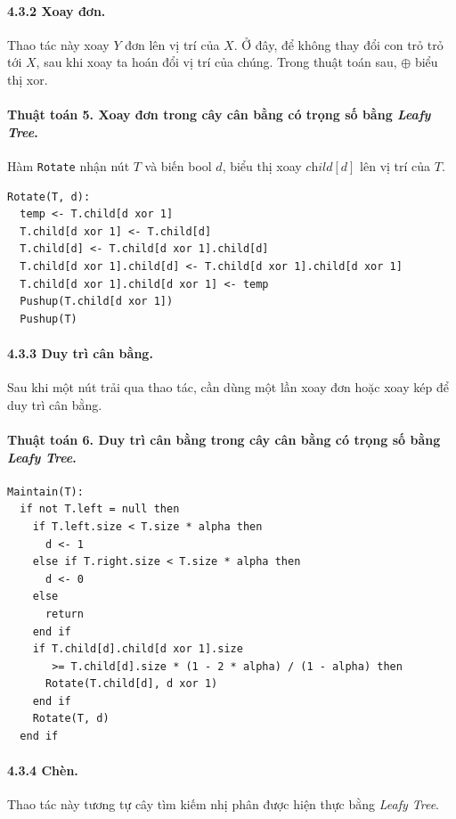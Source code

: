 \documentclass[11pt]{article}
\begin{document}
\paragraph{4.3.2 Xoay đơn.}
Thao tác này xoay \(Y\) đơn lên vị trí của \(X\). Ở đây, để không thay đổi con
trỏ trỏ tới \(X\), sau khi xoay ta hoán đổi vị trí của chúng. Trong thuật toán
sau, \(\oplus\) biểu thị xor.

\paragraph{Thuật toán 5. Xoay đơn trong cây cân bằng có trọng số bằng \emph{Leafy Tree}.}
Hàm \texttt{Rotate} nhận nút \(T\) và biến bool \(d\), biểu thị xoay
\(\textit{child}[d]\) lên vị trí của \(T\).
\begin{verbatim}
Rotate(T, d):
  temp <- T.child[d xor 1]
  T.child[d xor 1] <- T.child[d]
  T.child[d] <- T.child[d xor 1].child[d]
  T.child[d xor 1].child[d] <- T.child[d xor 1].child[d xor 1]
  T.child[d xor 1].child[d xor 1] <- temp
  Pushup(T.child[d xor 1])
  Pushup(T)
\end{verbatim}

\paragraph{4.3.3 Duy trì cân bằng.}
Sau khi một nút trải qua thao tác, cần dùng một lần xoay đơn hoặc xoay kép để
duy trì cân bằng.

\paragraph{Thuật toán 6. Duy trì cân bằng trong cây cân bằng có trọng số bằng \emph{Leafy Tree}.}
\begin{verbatim}
Maintain(T):
  if not T.left = null then
    if T.left.size < T.size * alpha then
      d <- 1
    else if T.right.size < T.size * alpha then
      d <- 0
    else
      return
    end if
    if T.child[d].child[d xor 1].size
       >= T.child[d].size * (1 - 2 * alpha) / (1 - alpha) then
      Rotate(T.child[d], d xor 1)
    end if
    Rotate(T, d)
  end if
\end{verbatim}

\paragraph{4.3.4 Chèn.}
Thao tác này tương tự cây tìm kiếm nhị phân được hiện thực bằng
\emph{Leafy Tree}.
\end{document}
